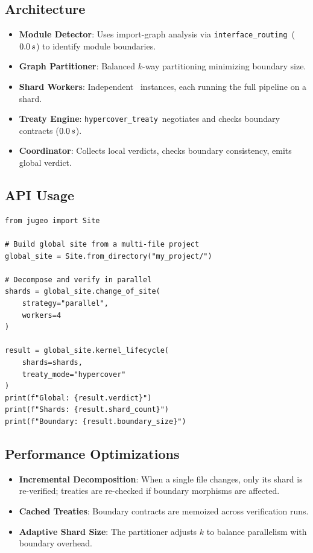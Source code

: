 \documentclass[11pt]{article}
\newcommand{\InterfaceRoute}{\texttt{interface\_routing}}
\newcommand{\HypercoverTreaty}{\texttt{hypercover\_treaty}}
\begin{document}
\subsection{Architecture}
\begin{itemize}[noitemsep]
  \item \textbf{Module Detector}: Uses import-graph analysis via
        \InterfaceRoute\ ($0.0\,s$) to
        identify module boundaries.
  \item \textbf{Graph Partitioner}: Balanced $k$-way partitioning
        minimizing boundary size.
  \item \textbf{Shard Workers}: Independent \JuGeo\ instances,
        each running the full pipeline on a shard.
  \item \textbf{Treaty Engine}: \HypercoverTreaty\ negotiates and
        checks boundary contracts ($0.0\,s$).
  \item \textbf{Coordinator}: Collects local verdicts, checks
        boundary consistency, emits global verdict.
\end{itemize}

\subsection{API Usage}
\begin{lstlisting}[style=jugeo-python]
from jugeo import Site

# Build global site from a multi-file project
global_site = Site.from_directory("my_project/")

# Decompose and verify in parallel
shards = global_site.change_of_site(
    strategy="parallel",
    workers=4
)

result = global_site.kernel_lifecycle(
    shards=shards,
    treaty_mode="hypercover"
)
print(f"Global: {result.verdict}")
print(f"Shards: {result.shard_count}")
print(f"Boundary: {result.boundary_size}")
\end{lstlisting}

\subsection{Performance Optimizations}
\begin{itemize}[noitemsep]
  \item \textbf{Incremental Decomposition}: When a single file
        changes, only its shard is re-verified; treaties are
        re-checked if boundary morphisms are affected.
  \item \textbf{Cached Treaties}: Boundary contracts are memoized
        across verification runs.
  \item \textbf{Adaptive Shard Size}: The partitioner adjusts $k$
        to balance parallelism with boundary overhead.
\end{itemize}
\end{document}
